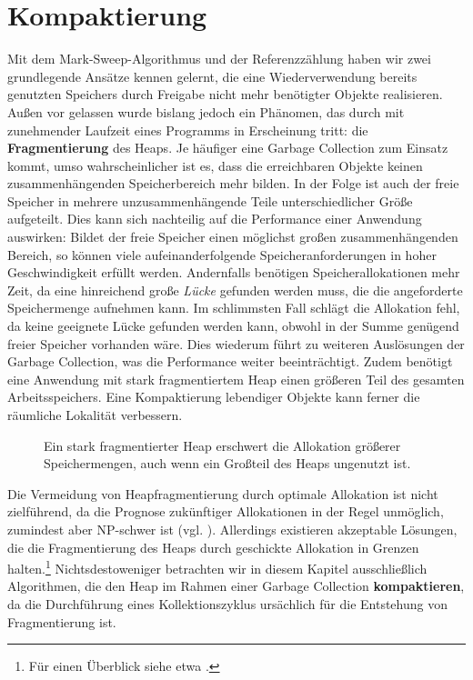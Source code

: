 \chapter{Kompaktierung}
\label{cha:compacting}
Mit dem Mark-Sweep-Algorithmus und der Referenzzählung haben wir zwei grundlegende Ansätze kennen gelernt, die eine Wiederverwendung bereits genutzten Speichers durch Freigabe nicht mehr benötigter Objekte realisieren.
Außen vor gelassen wurde bislang jedoch ein Phänomen, das durch mit zunehmender Laufzeit eines Programms in Erscheinung tritt:
die \textbf{Fragmentierung} des Heaps.
Je häufiger eine Garbage Collection zum Einsatz kommt, umso wahrscheinlicher ist es, dass die erreichbaren Objekte keinen zusammenhängenden Speicherbereich mehr bilden.
In der Folge ist auch der freie Speicher in mehrere unzusammenhängende Teile unterschiedlicher Größe aufgeteilt.
Dies kann sich nachteilig auf die Performance einer Anwendung auswirken:
Bildet der freie Speicher einen möglichst großen zusammenhängenden Bereich, so können viele aufeinanderfolgende Speicheranforderungen in hoher Geschwindigkeit erfüllt werden.
Andernfalls benötigen Speicherallokationen mehr Zeit, da eine hinreichend große \textit{Lücke} gefunden werden muss, die die angeforderte Speichermenge aufnehmen kann.
Im schlimmsten Fall schlägt die Allokation fehl, da keine geeignete Lücke gefunden werden kann, obwohl in der Summe genügend freier Speicher vorhanden wäre.
Dies wiederum führt zu weiteren Auslösungen der Garbage Collection, was die Performance weiter beeinträchtigt.
Zudem benötigt eine Anwendung mit stark fragmentiertem Heap einen größeren Teil des gesamten Arbeitsspeichers.
Eine Kompaktierung lebendiger Objekte kann ferner die räumliche Lokalität verbessern.

\begin{figure}[h]
	\centering
	
	\caption[Fragmentierter Heap]{Ein stark fragmentierter Heap erschwert die Allokation größerer Speichermengen, auch wenn ein Großteil des Heaps ungenutzt ist.}
	\label{fig:fragmentation}
\end{figure}

Die Vermeidung von Heapfragmentierung durch optimale Allokation ist nicht zielführend, da die Prognose zukünftiger Allokationen in der Regel unmöglich, zumindest aber NP-schwer ist (vgl. \cite{robson1980}).
Allerdings existieren akzeptable Lösungen, die die Fragmentierung des Heaps durch geschickte Allokation in Grenzen halten.\footnote{Für einen Überblick siehe etwa \cite[Kap. 7]{handbook}.}
Nichtsdestoweniger betrachten wir in diesem Kapitel ausschließlich Algorithmen, die den Heap im Rahmen einer Garbage Collection \textbf{kompaktieren}, da die Durchführung eines Kollektionszyklus ursächlich für die Entstehung von Fragmentierung ist.

